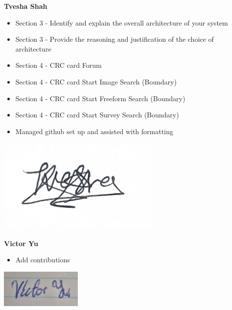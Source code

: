 \documentclass[]{article}
\begin{document}
\textbf{Tvesha Shah}
\begin{itemize}
    \setlength\itemindent{2em}
    \item Section 3 -  Identify and explain the overall architecture of your system  
    \item Section 3 - Provide the reasoning and justification of the choice of architecture 
    \item Section 4 - CRC card Forum 
    \item Section 4 - CRC card Start Image Search (Boundary)
    \item Section 4 - CRC card Start Freeform Search (Boundary)
    \item Section 4 - CRC card Start Survey Search (Boundary) 
    \item Managed github set up and assisted with formatting
\end{itemize} 
\includegraphics[width=0.6\textwidth]{Tvesha.png}

\textbf{Victor Yu}
\begin{itemize}
    \setlength\itemindent{2em}
\item Add contributions 
\end{itemize}
\includegraphics[width=0.3\textwidth]{Victor.png}
\end{document}
